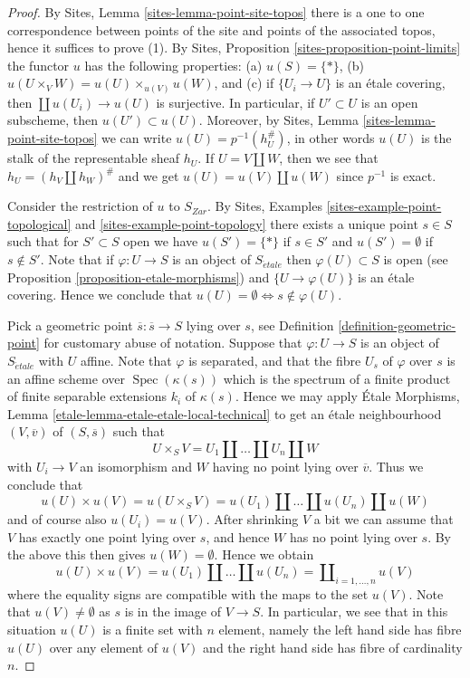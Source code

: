 \documentclass[10pt,a4paper]{amsart}
\theoremstyle{plain}
\theoremstyle{definition}
\theoremstyle{remark}
\numberwithin{equation}{subsection}
\def\Spec{\mathop{\mathrm{Spec}}}
\def\etale{{\acute{e}tale}}
\begin{document}
\begin{proof}
By
Sites, Lemma \ref{sites-lemma-point-site-topos}
there is a one to one correspondence between points of the site and points
of the associated topos, hence it suffices to prove (1).
By
Sites, Proposition \ref{sites-proposition-point-limits}
the functor $u$ has the following properties:
(a) $u(S) = \{*\}$, (b) $u(U \times_V W) = u(U) \times_{u(V)} u(W)$, and
(c) if $\{U_i \to U\}$ is an \'etale covering, then
$\coprod u(U_i) \to u(U)$ is surjective.
In particular, if $U' \subset U$ is an open subscheme,
then $u(U') \subset u(U)$. Moreover, by
Sites, Lemma \ref{sites-lemma-point-site-topos}
we can write $u(U) = p^{-1}(h_U^\#)$, in other words $u(U)$ is the
stalk of the representable sheaf $h_U$. If
$U = V \amalg W$, then we see that $h_U = (h_V \amalg h_W)^\#$ and we get
$u(U) = u(V) \amalg u(W)$ since $p^{-1}$ is exact.

\medskip\noindent
Consider the restriction of $u$ to $S_{Zar}$. By
Sites, Examples \ref{sites-example-point-topological} and
\ref{sites-example-point-topology}
there exists a unique point $s \in S$ such that for $S' \subset S$ open we
have $u(S') = \{*\}$ if $s \in S'$ and $u(S') = \emptyset$ if $s \not \in S'$.
Note that if $\varphi : U \to S$ is an object of $S_\etale$ then
$\varphi(U) \subset S$ is open (see
Proposition \ref{proposition-etale-morphisms})
and $\{U \to \varphi(U)\}$ is an \'etale covering. Hence we conclude that
$u(U) = \emptyset \Leftrightarrow s \not \in \varphi(U)$.

\medskip\noindent
Pick a geometric point $\overline{s} : \overline{s} \to S$ lying over $s$, see
Definition \ref{definition-geometric-point}
for customary abuse of notation. Suppose that $\varphi : U \to S$ is an object
of $S_\etale$ with $U$ affine. Note that $\varphi$ is separated, and
that the fibre $U_s$ of $\varphi$ over $s$ is an affine scheme over
$\Spec(\kappa(s))$ which is the spectrum of a finite product of
finite separable extensions $k_i$ of $\kappa(s)$. Hence we may apply
\'Etale Morphisms, Lemma \ref{etale-lemma-etale-etale-local-technical}
to get an \'etale neighbourhood $(V, \overline{v})$ of $(S, \overline{s})$
such that
$$
U \times_S V = U_1 \amalg \ldots \amalg U_n \amalg W
$$
with $U_i \to V$ an isomorphism and $W$ having no point lying over
$\overline{v}$. Thus we conclude that
$$
u(U) \times u(V) =
u(U \times_S V) =
u(U_1) \amalg \ldots \amalg u(U_n) \amalg u(W)
$$
and of course also $u(U_i) = u(V)$. After shrinking $V$ a bit we can
assume that $V$ has exactly one point lying over $s$, and hence $W$ has no
point lying over $s$. By the above this then gives $u(W) = \emptyset$.
Hence we obtain
$$
u(U) \times u(V) =
u(U_1) \amalg \ldots \amalg u(U_n) =
\coprod\nolimits_{i = 1, \ldots, n} u(V)
$$
where the equality signs are compatible with the maps to the set $u(V)$.
Note that $u(V) \not = \emptyset$ as $s$ is in the image of $V \to S$.
In particular, we see that in this situation $u(U)$ is a finite
set with $n$ element, namely the left hand side has fibre $u(U)$ over
any element of $u(V)$ and the right hand side has fibre of cardinality $n$.


\end{proof}
\end{document}
